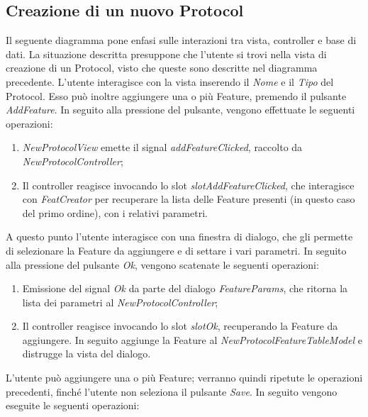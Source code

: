 \subsection{Creazione di un nuovo Protocol}
Il seguente diagramma pone enfasi sulle interazioni tra vista, controller e base di dati. La situazione descritta presuppone che l'utente si trovi nella vista di creazione di un Protocol\g{}, visto che queste sono descritte nel diagramma precedente.
L'utente interagisce con la vista inserendo il \textit{Nome} e il \textit{Tipo} del Protocol\g{}. Esso può inoltre aggiungere una o più Feature\g{}, premendo il pulsante \textit{AddFeature}. In seguito alla pressione del pulsante, vengono effettuate le seguenti operazioni:
\begin{enumerate}
	\item \textit{NewProtocolView} emette il signal\g{} \textit{addFeatureClicked}, raccolto da \textit{NewProtocolController};
	\item Il controller reagisce invocando lo slot\g{} \textit{slotAddFeatureClicked}, che interagisce con \textit{FeatCreator} per recuperare la lista delle Feature\g{} presenti (in questo caso del primo ordine), con i relativi parametri.
\end{enumerate}
A questo punto l'utente interagisce con una finestra di dialogo, che gli permette di selezionare la Feature\g{} da aggiungere e di settare i vari parametri. In seguito alla pressione del pulsante \textit{Ok}, vengono scatenate le seguenti operazioni:
\begin{enumerate}
	\item Emissione del signal \textit{Ok} da parte del dialogo \textit{FeatureParams}, che ritorna la lista dei parametri al \textit{NewProtocolController};
	\item Il controller reagisce invocando lo slot\g{} \textit{slotOk}, recuperando la Feature\g{} da aggiungere. In seguito aggiunge la Feature\g{} al \textit{NewProtocolFeatureTableModel} e distrugge la vista del dialogo.
\end{enumerate}
L'utente può aggiungere una o più Feature{}; verranno quindi ripetute le operazioni precedenti, finché l'utente non seleziona il pulsante \textit{Save}. In seguito vengono eseguite le seguenti operazioni:
